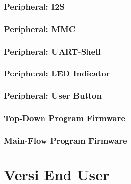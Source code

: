 \documentclass[12pt,]{article}
\begin{document}
	\subsubsection{Peripheral: I2S}
	\subsubsection{Peripheral: MMC}
	\subsubsection{Peripheral: UART-Shell}
	\subsubsection{Peripheral: LED Indicator}
	\subsubsection{Peripheral: User Button}
	\subsubsection{Top-Down Program Firmware}
	\subsubsection{Main-Flow Program Firmware}
	
	\newpage
	\section{Versi End User}
\end{document}
